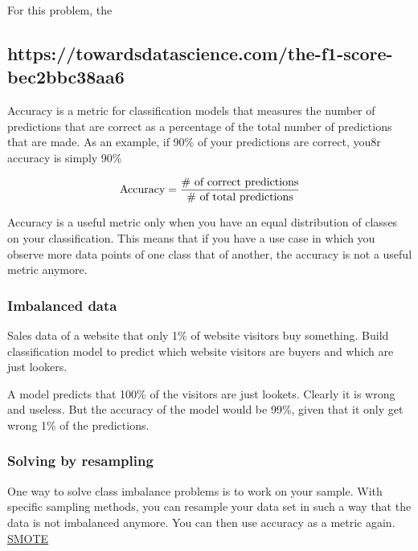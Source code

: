 For this problem, the

\hypertarget{httpstowardsdatascience.comthe-f1-score-bec2bbc38aa6}{%
\subsection{https://towardsdatascience.com/the-f1-score-bec2bbc38aa6}\label{httpstowardsdatascience.comthe-f1-score-bec2bbc38aa6}}

Accuracy is a metric for classification models that measures the number
of predictions that are correct as a percentage of the total number of
predictions that are made. As an example, if 90\% of your predictions
are correct, you8r accuracy is simply 90\%

\begin{align*}
\textnormal{Accuracy} = \frac{\# \textnormal{ of correct predictions}}{\# \textnormal{ of total predictions}}
\end{align*}

Accuracy is a useful metric only when you have an equal distribution of
classes on your classification. This means that if you have a use case
in which you observe more data points of one class that of another, the
accuracy is not a useful metric anymore.

\hypertarget{imbalanced-data}{%
\subsubsection{Imbalanced data}\label{imbalanced-data}}

Sales data of a website that only 1\% of website visitors buy something.
Build classification model to predict which website visitors are buyers
and which are just lookers.

A model predicts that 100\% of the visitors are just lookets. Clearly it
is wrong and useless. But the accuracy of the model would be 99\%, given
that it only get wrong 1\% of the predictions.

\hypertarget{solving-by-resampling}{%
\subsubsection{Solving by resampling}\label{solving-by-resampling}}

One way to solve class imbalance problems is to work on your sample.
With specific sampling methods, you can resample your data set in such a
way that the data is not imbalanced anymore. You can then use accuracy
as a metric again.
\href{https://towardsdatascience.com/smote-fdce2f605729}{SMOTE}

